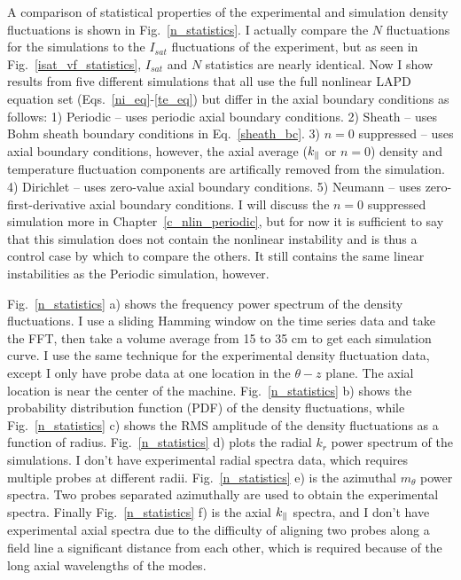 A comparison of statistical properties of the experimental and simulation density fluctuations is shown in Fig.~\ref{n_statistics}. I actually compare the $N$ fluctuations for the simulations
to the $I_{sat}$ fluctuations of the experiment, but as seen in Fig.~\ref{isat_vf_statistics}, $I_{sat}$ and $N$ statistics are nearly identical.
Now I show results from five different simulations
that all use the full nonlinear LAPD equation set (Eqs.~\ref{ni_eq}-\ref{te_eq}) but differ in the axial boundary conditions as follows:
1) Periodic -- uses periodic axial boundary conditions. 2) Sheath -- uses Bohm sheath boundary conditions in Eq.~\ref{sheath_bc}. 3) $n=0$ suppressed -- uses axial boundary conditions,
however, the axial average ($k_\parallel$ or $n = 0$) density and temperature fluctuation components are artifically removed from the simulation. 4) Dirichlet -- uses zero-value axial
boundary conditions. 5) Neumann -- uses zero-first-derivative axial boundary conditions. I will discuss the $n=0$ suppressed simulation more in Chapter~\ref{c_nlin_periodic}, but for
now it is sufficient to say that this simulation does not contain the nonlinear instability and is thus a control case by which to compare the others. It still contains the same
linear instabilities as the Periodic simulation, however.

Fig.~\ref{n_statistics} a) shows the frequency power spectrum of the density fluctuations. I use a sliding Hamming window on the time series data and take the FFT, then take a volume
average from 15 to 35 cm to get each simulation curve. I use the same technique for the experimental density fluctuation data, except I only have probe data at one location in the
$\theta-z$ plane. The axial location is near the center of the machine. Fig.~\ref{n_statistics} b) shows the probability distribution function (PDF) of the density fluctuations,
while Fig.~\ref{n_statistics} c) shows the RMS amplitude of the density fluctuations as a function of radius. Fig.~\ref{n_statistics} d) plots the radial $k_r$ power spectrum of the simulations.
I don't have experimental radial spectra data, which requires multiple probes at different radii. Fig.~\ref{n_statistics} e) is the azimuthal $m_\theta$ power spectra. 
Two probes separated azimuthally are used to obtain the experimental spectra. Finally Fig.~\ref{n_statistics} f) is the axial $k_\parallel$ spectra, and I don't have experimental axial spectra due
to the difficulty of aligning two probes along a field line a significant distance from each other, which is required because of the long axial wavelengths of the modes.

